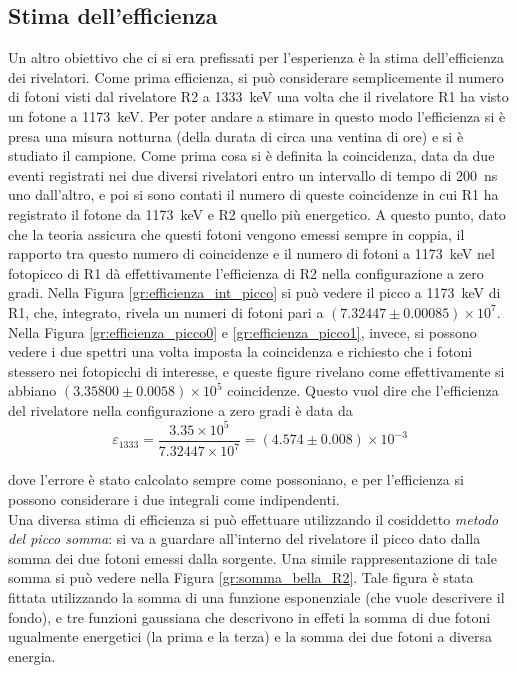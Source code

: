 \subsection{Stima dell'efficienza}
Un altro obiettivo che ci si era prefissati per l'esperienza è la stima dell'efficienza dei rivelatori. Come prima efficienza, si può considerare semplicemente il numero
di fotoni visti dal rivelatore R2 a 1333~keV una volta che il rivelatore R1 ha visto un fotone a 1173~keV. Per poter andare a stimare in questo modo l'efficienza si è presa
una misura notturna (della durata di circa una ventina di ore) e si è studiato il campione. Come prima cosa si è definita la coincidenza, data da due eventi
registrati nei due diversi rivelatori entro un intervallo di tempo di 200~ns uno dall'altro, e poi si sono contati il numero di queste coincidenze in cui R1 ha registrato
il fotone da 1173~keV e R2 quello più energetico. A questo punto, dato che la teoria assicura che questi fotoni vengono emessi sempre in coppia, il rapporto tra questo
numero di coincidenze e il numero di fotoni a 1173~keV nel fotopicco di R1 dà effettivamente l'efficienza di R2 nella configurazione a zero gradi. Nella
Figura \ref{gr:efficienza_int_picco} si può vedere il picco a 1173~keV di R1, che, integrato, rivela un numeri di fotoni pari a $(7.32447 \pm 0.00085)\times 10^7$.
Nella Figura \ref{gr:efficienza_picco0} e \ref{gr:efficienza_picco1}, invece, si possono vedere i due spettri una volta imposta la coincidenza e richiesto che i fotoni stessero
nei fotopicchi di interesse, e queste figure rivelano come effettivamente si abbiano $(3.35800 \pm 0.0058)\times 10^5$ coincidenze. Questo vuol dire che l'efficienza del rivelatore nella configurazione
a zero gradi è data da
$$\varepsilon_{1333}=\frac{3.35\times 10^5}{7.32447 \times 10^7}=(4.574 \pm 0.008)\times 10^{-3}$$



dove l'errore è stato calcolato sempre come possoniano, e per l'efficienza si possono considerare i due integrali come indipendenti.\\

\FloatBarrier
Una diversa stima di efficienza si può effettuare utilizzando il cosiddetto \textit{metodo del picco somma}: si va a guardare all'interno del rivelatore il picco dato dalla 
somma dei due fotoni emessi dalla sorgente. Una simile rappresentazione di tale somma si può vedere nella Figura \ref{gr:somma_bella_R2}. Tale figura è stata fittata 
utilizzando la somma di una funzione esponenziale (che vuole descrivere il fondo), e tre funzioni gaussiana che descrivono in effeti la somma di due fotoni ugualmente energetici
(la prima e la terza) e la somma dei due fotoni a diversa energia.\\


